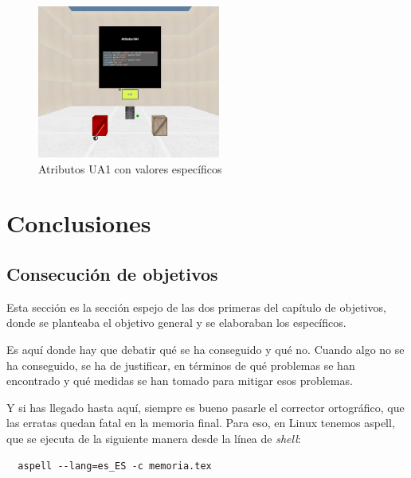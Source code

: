 \documentclass[a4paper, 12pt]{book}
\begin{document}
\begin{figure}
  \centering
  \includegraphics[width=6cm, keepaspectratio]{img/resultados/UA1_Iniciado.png}
  \caption{Atributos UA1 con valores específicos}
  \label{fig:UA1_Iniciado}
\end{figure}





\cleardoublepage
\chapter{Conclusiones}
\label{chap:conclusiones}


\section{Consecución de objetivos}
\label{sec:consecucion-objetivos}

Esta sección es la sección espejo de las dos primeras del capítulo de objetivos, donde se planteaba el objetivo general y se elaboraban los específicos.

Es aquí donde hay que debatir qué se ha conseguido y qué no. 
Cuando algo no se ha conseguido, se ha de justificar, en términos de qué problemas se han encontrado y qué medidas se han tomado para mitigar esos problemas.

Y si has llegado hasta aquí, siempre es bueno pasarle el corrector ortográfico, que las erratas quedan fatal en la memoria final.
Para eso, en Linux tenemos aspell, que se ejecuta de la siguiente manera desde la línea de \emph{shell}:

\begin{verbatim}
  aspell --lang=es_ES -c memoria.tex
\end{verbatim}
\end{document}

